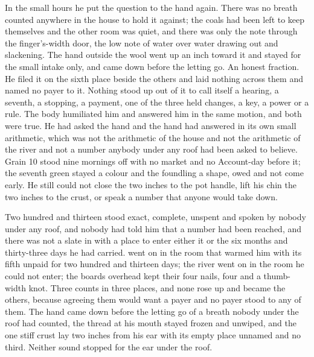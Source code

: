 \scenebreak

In the small hours he put the question to the hand again. There was no breath counted anywhere in the house to hold it against; the coals had been left to keep themselves and the other room was quiet, and there was only the note through the finger's-width door, the low note of water over water drawing out and slackening. The hand outside the wool went up an inch toward it and stayed for the small intake only, and came down before the letting go. An honest fraction. He filed it on the sixth place beside the others and laid nothing across them and named no payer to it. Nothing stood up out of it to call itself a hearing, a seventh, a stopping, a payment, one of the three held changes, a key, a power or a rule. The body humiliated him and answered him in the same motion, and both were true. He had asked the hand and the hand had answered in its own small arithmetic, which was not the arithmetic of the house and not the arithmetic of the river and not a number anybody under any roof had been asked to believe. Grain 10 stood nine mornings off with no market and no Account-day before it; the seventh green stayed a colour and the foundling a shape, owed and not come early. He still could not close the two inches to the pot handle, lift his chin the two inches to the crust, or speak a number that anyone would take down.

Two hundred and thirteen stood exact, complete, unspent and spoken by nobody under any roof, and nobody had told him that a number had been reached, and there was not a slate in  with a place to enter either it or the six months and thirty-three days he had carried.  went on in the room that warmed him with its fifth unpaid for two hundred and thirteen days; the river went on in the room he could not enter; the boards overhead kept their four nails, four and a thumb-width knot. Three counts in three places, and none rose up and became the others, because agreeing them would want a payer and no payer stood to any of them. The hand came down before the letting go of a breath nobody under the roof had counted, the thread at his mouth stayed frozen and unwiped, and the one stiff crust lay two inches from his ear with its empty place unnamed and no third. Neither sound stopped for the ear under the roof.
